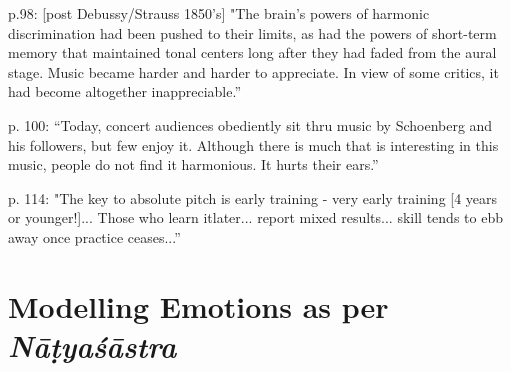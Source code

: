 \begin{myquote}
p.98: [post Debussy/Strauss 1850’s] "The brain’s powers of harmonic discrimination had been pushed to their limits, as had the powers of short-term memory that maintained tonal centers long after they had faded from the aural stage. Music became harder and harder to appreciate. In view of some critics, it had become altogether inappreciable.” 

p. 100: “Today, concert audiences obediently sit thru music by Schoenberg and his followers, but few enjoy it. Although there is much that is interesting in this music, people do not find it harmonious. It hurts their ears.”

p. 114: "The key to absolute pitch is early training - very early training [4 years or younger!]... Those who learn itlater... report mixed results... skill tends to ebb away once practice ceases...”
\end{myquote}

\section*{Modelling Emotions as per \textsl{Nāṭyaśāstra}}

